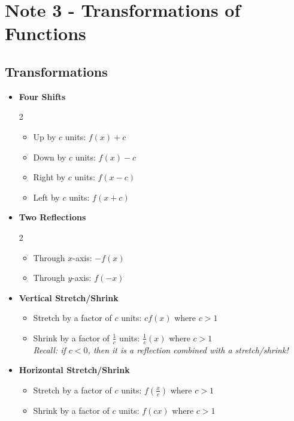 \documentclass[10pt]{article}
\author{}
\date{}
\begin{document}
\section*{\centering Note 3 - Transformations of Functions}

\subsection*{Transformations}

\begin{itemize}
    \item \textbf{Four Shifts}
        \begin{multicols}{2}
        \begin{itemize}[label=$\circ$]
            \item Up by $c$ units: $f(x) + c$
            \item Down by $c$ units: $f(x) - c$
            \item Right by $c$ units: $f(x-c)$
            \item Left by $c$ units: $f(x + c)$
        \end{itemize}
        \end{multicols}
        
    \item \textbf{Two Reflections}
        \begin{multicols}{2}
        \begin{itemize}[label=$\circ$]
            \item Through $x$-axis: $-f(x)$
            \item Through $y$-axis: $f(-x)$
        \end{itemize}
        \end{multicols}
    
    \item \textbf{Vertical Stretch/Shrink}
        \begin{itemize}[label=$\circ$]
            \item Stretch by a factor of $c$ units: $cf(x)$ where $c > 1$
            \item Shrink by a factor of $\frac{1}{c}$ units: $\frac{1}{c}(x)$ where $c > 1$ \\
            \textit{Recall: if $c < 0$, then it is a reflection combined with a stretch/shrink!}
        \end{itemize}
    
    \item \textbf{Horizontal Stretch/Shrink}
        \begin{itemize}[label=$\circ$]
            \item Stretch by a factor of $c$ units: $f(\frac{x}{c})$ where $c > 1$
            \item Shrink by a factor of $c$ units: $f(cx)$ where $c > 1$ \\
        \end{itemize}


\end{itemize}
\end{document}
